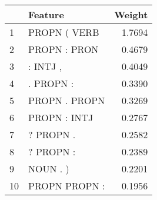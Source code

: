 \begin{tabular}{llr}
\toprule
{} &        Feature &  Weight \\
\midrule
1  &   PROPN ( VERB &  1.7694 \\
2  &   PROPN : PRON &  0.4679 \\
3  &       : INTJ , &  0.4049 \\
4  &      . PROPN : &  0.3390 \\
5  &  PROPN . PROPN &  0.3269 \\
6  &   PROPN : INTJ &  0.2767 \\
7  &      ? PROPN . &  0.2582 \\
8  &      ? PROPN : &  0.2389 \\
9  &       NOUN . ) &  0.2201 \\
10 &  PROPN PROPN : &  0.1956 \\
\bottomrule
\end{tabular}
